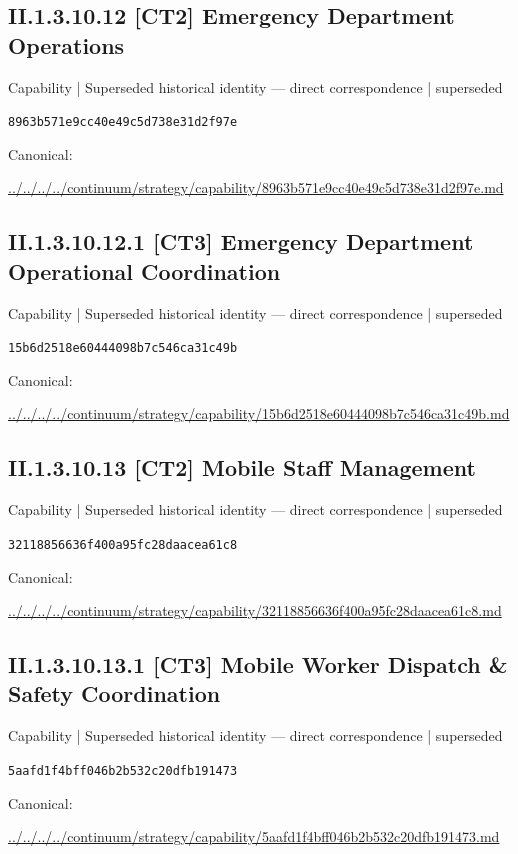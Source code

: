 \documentclass[10pt,a4paper]{article}
\begin{document}
\subsection*{II.1.3.10.12 [CT2] Emergency Department Operations}
{\small Capability | Superseded historical identity — direct correspondence | superseded}\par
\texttt{8963b571e9cc40e49c5d738e31d2f97e}\par
Canonical: \par
{\footnotesize\url{../../../../continuum/strategy/capability/8963b571e9cc40e49c5d738e31d2f97e.md}}\par
\subsection*{II.1.3.10.12.1 [CT3] Emergency Department Operational Coordination}
{\small Capability | Superseded historical identity — direct correspondence | superseded}\par
\texttt{15b6d2518e60444098b7c546ca31c49b}\par
Canonical: \par
{\footnotesize\url{../../../../continuum/strategy/capability/15b6d2518e60444098b7c546ca31c49b.md}}\par
\subsection*{II.1.3.10.13 [CT2] Mobile Staff Management}
{\small Capability | Superseded historical identity — direct correspondence | superseded}\par
\texttt{32118856636f400a95fc28daacea61c8}\par
Canonical: \par
{\footnotesize\url{../../../../continuum/strategy/capability/32118856636f400a95fc28daacea61c8.md}}\par
\subsection*{II.1.3.10.13.1 [CT3] Mobile Worker Dispatch \& Safety Coordination}
{\small Capability | Superseded historical identity — direct correspondence | superseded}\par
\texttt{5aafd1f4bff046b2b532c20dfb191473}\par
Canonical: \par
{\footnotesize\url{../../../../continuum/strategy/capability/5aafd1f4bff046b2b532c20dfb191473.md}}\par
\end{document}
